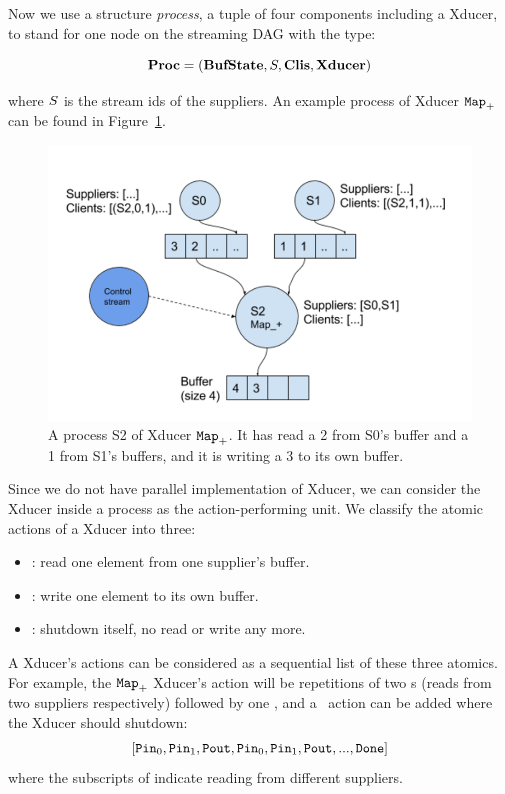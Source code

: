 Now we use a structure \emph{process}, a tuple of four components including a Xducer, to stand for one node on the streaming DAG with the type:

$$ \proc  =  (\bufst, \S, \clis, \xducer) $$

where $\S$ is the stream ids of the suppliers. An example process of Xducer $\map{+}$ can be found in Figure~\ref{fig:process}.

\begin{figure}
	\centering
	\includegraphics[width=1.0\textwidth]{process2}
	\caption{A process S2 of Xducer $\map{+}$. It has read a 2 from S0's buffer and a 1 from S1's buffers, and it is writing a 3 to its own buffer.}
	\label{fig:process}
\end{figure}

Since we do not have parallel implementation of Xducer, we can consider the Xducer inside a process as the action-performing unit. 
We classify the atomic actions of a Xducer into three:
\begin{itemize}
	\item {\pin}: read one element from one supplier's buffer.
	\item {\pout}: write one element to its own buffer.
	\item {\done}: shutdown itself, no read or write any more.
\end{itemize}

A Xducer's actions can be considered as a sequential list of these three atomics.
For example,  the $\map{+}$ Xducer's action will be repetitions of two {\pin}s (reads from two suppliers respectively) followed by one {\pout}, and 
a {\done} \ action can be added where the Xducer should shutdown:
$$[{\pin}_0, {\pin}_1, {\pout}, {\pin}_0, {\pin}_1, {\pout},... ,{\done}]$$
 where the subscripts of {\pin} indicate reading from different suppliers.



